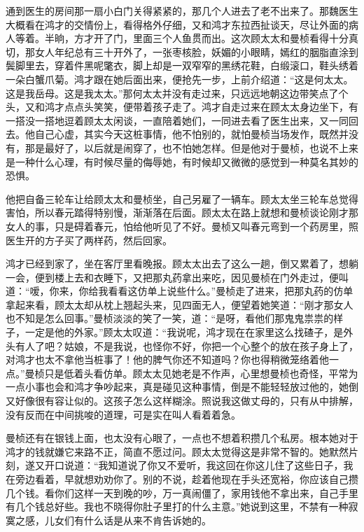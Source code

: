\par 通到医生的房间那一扇小白门关得紧紧的，那几个人进去了老不出来了。那魏医生大概看在鸿才的交情份上，看得格外仔细，又和鸿才东拉西扯谈天，尽让外面的病人等着。半晌，方才开了门，里面三个人鱼贯而出。这次顾太太和曼桢看得十分真切，那女人年纪总有三十开外了，一张枣核脸，妖媚的小眼睛，嫣红的胭脂直涂到鬓脚里去，穿着件黑呢氅衣，脚上却是一双窄窄的黑绣花鞋，白缎滚口，鞋头绣着一朵白蟹爪菊。鸿才跟在她后面出来，便抢先一步，上前介绍道：“这是何太太。这是我岳母。这是我太太。”那何太太并没有走过来，只远远地朝这边带笑点了个头，又和鸿才点点头笑笑，便带着孩子走了。鸿才自走过来在顾太太身边坐下，有一搭没一搭地逗着顾太太闲谈，一直陪着她们，一同进去看了医生出来，又一同回去。他自己心虚，其实今天这桩事情，他不怕别的，就怕曼桢当场发作，既然并没有，那是最好了，以后就是闹穿了，也不怕她怎样。但是他对于曼桢，也说不上来是一种什么心理，有时候尽量的侮辱她，有时候却又微微的感觉到一种莫名其妙的恐惧。
\par 他把自备三轮车让给顾太太和曼桢坐，自己另雇了一辆车。顾太太坐三轮车总觉得害怕，所以春元踏得特别慢，渐渐落在后面。顾太太在路上就想和曼桢谈论刚才那女人的事，只是碍着春元，怕给他听见了不好。曼桢又叫春元弯到一个药房里，照医生开的方子买了两样药，然后回家。
\par 鸿才已经到家了，坐在客厅里看晚报。顾太太出去了这么一趟，倒又累着了，想躺一会，便到楼上去和衣睡下，又把那丸药拿出来吃，因见曼桢在门外走过，便叫道：“嗳，你来，你给我看看这仿单上说些什么。”曼桢走了进来，把那丸药的仿单拿起来看，顾太太却从枕上翘起头来，见四面无人，便望着她笑道：“刚才那女人也不知是怎么回事。”曼桢淡淡的笑了一笑，道：“是呀，看他们那鬼鬼祟祟的样子，一定是他的外家。”顾太太叹道：“我说呢，鸿才现在在家里这么找碴子，是外头有人了吧？姑娘，不是我说，也怪你不好，你把一个心整个的放在孩子身上了，对鸿才也太不拿他当桩事了！他的脾气你还不知道吗？你也得稍微笼络着他一点。”曼桢只是低着头看仿单。顾太太见她老是不作声，心里想曼桢也奇怪，平常为一点小事也会和鸿才争吵起来，真是碰见这种事情，倒是不能轻轻放过他的，她倒又好像很有容让似的。这孩子怎么这样糊涂。照说我这做丈母的，只有从中排解，没有反而在中间挑唆的道理，可是实在叫人看着着急。
\par 曼桢还有在银钱上面，也太没有心眼了，一点也不想着积攒几个私房。根本她对于鸿才的钱就嫌它来路不正，简直不愿过问。顾太太觉得这是非常不智的。她默然片刻，遂又开口说道：“我知道说了你又不爱听，我这回在你这儿住了这些日子，我在旁边看着，早就想劝劝你了。别的不说，趁着他现在手头还宽裕，你应该自己攒几个钱。看你们这样一天到晚的吵，万一真闹僵了，家用钱他不拿出来，自己手里有几个钱总好些。我也不晓得你肚子里打的什么主意。”她说到这里，不禁有一种寂寞之感，儿女们有什么话是从来不肯告诉她的。

